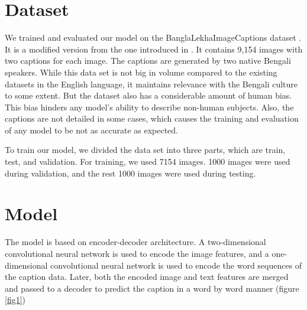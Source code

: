 \documentclass[runningheads]{llncs}
\begin{document}
\section{Dataset}
We trained and evaluated our model on the BanglaLekhaImageCaptions dataset \cite{BanglalekhaImageCaptions}. It is a modified version from the one introduced in \cite{chittron}. It contains 9,154 images with two captions for each image. The captions are generated by two native Bengali speakers. While this data set is not big in volume compared to the existing datasets in the English language, it maintains relevance with the Bengali culture to some extent. But the dataset also has a considerable amount of human bias. This bias hinders any model's ability to describe non-human subjects. Also, the captions are not detailed in some cases, which causes the training and evaluation of any model to be not as accurate as expected.

To train our model, we divided the data set into three parts, which are train, test, and validation. For training, we used 7154 images. 1000 images were used during validation, and the rest 1000 images were used during testing.

\section{Model}
The model is based on encoder-decoder architecture. A two-dimensional convolutional neural network is used to encode the image features, and a one-dimensional convolutional neural network is used to encode the word sequences of the caption data. Later, both the encoded image and text features are merged and passed to a decoder to predict the caption in a word by word manner (figure \ref{fig1})
\end{document}

